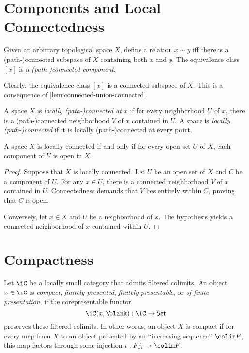 \documentclass{amsart}
\begin{document}
\section{Components and Local Connectedness}
\label{sec:components-and-local-connectedness}

\begin{defn}
  Given an arbitrary topological space $X$, define a relation $x \sim y$ iff there is a (path-)connected subspace of $X$ containing both $x$ and $y$.
  The equivalence class $[x]$ is a \emph{(path-)connected component}.
\end{defn}

Clearly, the equivalence class $[x]$ is a connected subspace of $X$.
This is a consequence of \cref{lem:connected-union-connected}.

\begin{defn}
  A space $X$ is \emph{locally (path-)connected at $x$} if for every neighborhood $U$ of $x$, there is a (path-)connected neighborhood $V$ of $x$ contained in $U$.
  A space is \emph{locally (path-)connected} if it is locally (path-)connected at every point.
\end{defn}

\begin{lem}
  A space $X$ is locally connected if and only if for every open set $U$ of $X$, each component of $U$ is open in $X$.
\end{lem}
\begin{proof}
  Suppose that $X$ is locally connected.
  Let $U$ be an open set of $X$ and $C$ be a component of $U$.
  For any $x \in U$, there is a connected neighborhood $V$ of $x$ contained in $U$.
  Connectedness demands that $V$ lies entirely within $C$, proving that $C$ is open.

  Conversely, let $x \in X$ and $U$ be a neighborhood of $x$.
  The hypothesis yields a connected neighborhood of $x$ contained within $U$.
\end{proof}

\section{Compactness}
\label{sec:compactness}

\begin{defn}
  Let $\iC$ be a locally small category that admits filtered colimits.
  An object $x \in \iC$ is \emph{compact}, \emph{finitely presented}, \emph{finitely presentable}, or \emph{of finite presentation}, if the corepresentable functor
  \[
    \iC(x,\blank) : \iC \to \mathsf{Set}
  \]
  preserves these filtered colimits.
  In other words, an object $X$ is compact if for every map from $X$ to an object presented by an ``increasing sequence'' $\colim F$, this map factors through some injection $\iota : Fj_{i} \to \colim F$.
\end{defn}
\end{document}
